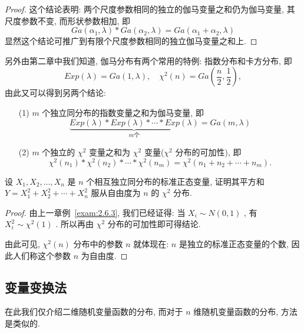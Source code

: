 \begin{example}[(伽玛分布的可加性)]
\begin{proof}
   		这个结论表明: 两个尺度参数相同的独立的伽马变量之和仍为伽马变量, 其尺度参数不变, 而形状参数相加, 即
   		\begin{equation}\label{eq:3.3.16}
   			Ga(\alpha_1,\lambda)\ast Ga(\alpha_2,\lambda)=Ga(\alpha_1+\alpha_2,\lambda)
   		\end{equation}
   		显然这个结论可推广到有限个尺度参数相同的独立伽马变量之和上.
   	\end{proof}
   	另外由第二章中我们知道, 伽马分布有两个常用的特例: 指数分布和卡方分布, 即
   	\begin{equation*}
   	Exp(\lambda)=Ga(1,\lambda),\quad\chi^2(n)=Ga\left( \frac{n}{2},\frac{1}{2}\right), 
   	\end{equation*}
   	由此又可以得到另两个结论:
   	\begin{itemize}
   		\item[(1)] $m$ 个独立同分布的指数变量之和为伽马变量, 即
   		\begin{equation}\label{eq:3.3.17}
   		\underbrace{Exp(\lambda)\ast Exp(\lambda)\ast\cdots\ast Exp(\lambda)}_{m\text{个}}=Ga(m,\lambda)
   		\end{equation}
   		\item[(2)] $m$ 个独立的 $\chi^2$ 变量之和为 $\chi^2$ 变量($\chi^2$ 分布的可加性), 即
   		\begin{equation}\label{eq:3.3.18}
   		\chi^2(n_1)\ast\chi^2(n_2)\ast\cdots\ast\chi^2(n_m)=\chi^2(n_1+n_2+\cdots+n_m).
   		\end{equation}
   	\end{itemize}
   \end{example}
   \begin{example}
   	设 $X_1,X_2,\ldots,X_n$ 是 $n$ 个相互独立同分布的标准正态变量, 证明其平方和 $Y=X_1^2+X_2^2+\cdots+X_n^2$ 服从自由度为 $n$ 的 $\chi^2$ 分布.
   	\begin{proof}
   		由上一章例~\ref{exam:2.6.3}, 我们已经证得: 当 $X_i\sim N(0,1)$ , 有 $X_i^2\sim\chi^2(1)$ . 所以再由 $\chi^2$ 分布的可加性即可得结论.
   		
   		由此可见, $\chi^2(n)$ 分布中的参数 $n$ 就体现在: $n$ 是独立的标准正态变量的个数, 因此人们称这个参数 $n$ 为自由度.
   	\end{proof}
   \end{example}
    
    \subsection{变量变换法}\label{ssec:3.3.4}
    在此我们仅介绍二维随机变量函数的分布, 而对于 $n$ 维随机变量函数的分布, 方法是类似的.
